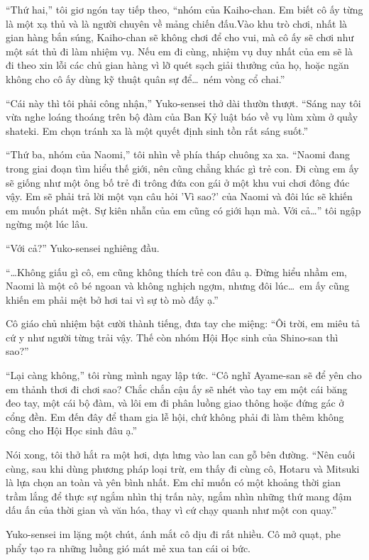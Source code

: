 \documentclass[../main.tex]{subfiles}
\begin{document}
``Thứ hai,'' tôi giơ ngón tay tiếp theo, ``nhóm của Kaiho-chan. Em biết cô ấy từng là một xạ thủ và là người chuyên về mảng chiến đấu.Vào khu trò chơi, nhất là gian hàng bắn súng, Kaiho-chan sẽ không chơi để cho vui, mà cô ấy sẽ chơi như một sát thủ đi làm nhiệm vụ. Nếu em đi cùng, nhiệm vụ duy nhất của em sẽ là đi theo xin lỗi các chủ gian hàng vì lỡ quét sạch giải thưởng của họ, hoặc ngăn không cho cô ấy dùng kỹ thuật quân sự để\dots\ ném vòng cổ chai.''

``Cái này thì tôi phải công nhận,'' Yuko-sensei thở dài thườn thượt. ``Sáng nay tôi vừa nghe loáng thoáng trên bộ đàm của Ban Kỷ luật báo về vụ lùm xùm ở quầy shateki. Em chọn tránh xa là một quyết định sinh tồn rất sáng suốt.''

``Thứ ba, nhóm của Naomi,'' tôi nhìn về phía tháp chuông xa xa. ``Naomi đang trong giai đoạn tìm hiểu thế giới, nên cũng chẳng khác gì trẻ con. Đi cùng em ấy sẽ giống như một ông bố trẻ đi trông đứa con gái ở một khu vui chơi đông đúc vậy. Em sẽ phải trả lời một vạn câu hỏi 'Vì sao?' của Naomi và đôi lúc sẽ khiến em muốn phát mệt. Sự kiên nhẫn của em cũng có giới hạn mà. Với cả\dots'' tôi ngập ngừng một lúc lâu.

``Với cả?'' Yuko-sensei nghiêng đầu.

``\dots Không giấu gì cô, em cũng không thích trẻ con đâu ạ. Đừng hiểu nhầm em, Naomi là một cô bé ngoan và không nghịch ngợm, nhưng đôi lúc\dots\ em ấy cũng khiến em phải mệt bở hơi tai vì sự tò mò đấy ạ.''

Cô giáo chủ nhiệm bật cười thành tiếng, đưa tay che miệng: ``Ôi trời, em miêu tả cứ y như người từng trải vậy. Thế còn nhóm Hội Học sinh của Shino-san thì sao?''

``Lại càng không,'' tôi rùng mình ngay lập tức. ``Cô nghĩ Ayame-san sẽ để yên cho em thảnh thơi đi chơi sao? Chắc chắn cậu ấy sẽ nhét vào tay em một cái băng đeo tay, một cái bộ đàm, và lôi em đi phân luồng giao thông hoặc đứng gác ở cổng đền. Em đến đây để tham gia lễ hội, chứ không phải đi làm thêm không công cho Hội Học sinh đâu ạ.''

Nói xong, tôi thở hắt ra một hơi, dựa lưng vào lan can gỗ bên đường. ``Nên cuối cùng, sau khi dùng phương pháp loại trừ, em thấy đi cùng cô, Hotaru và Mitsuki là lựa chọn an toàn và yên bình nhất. Em chỉ muốn có một khoảng thời gian trầm lắng để thực sự ngắm nhìn thị trấn này, ngắm nhìn những thứ mang đậm dấu ấn của thời gian và văn hóa, thay vì cứ chạy quanh như một con quay.''

Yuko-sensei im lặng một chút, ánh mắt cô dịu đi rất nhiều. Cô mở quạt, phe phẩy tạo ra những luồng gió mát mẻ xua tan cái oi bức.
\end{document}
